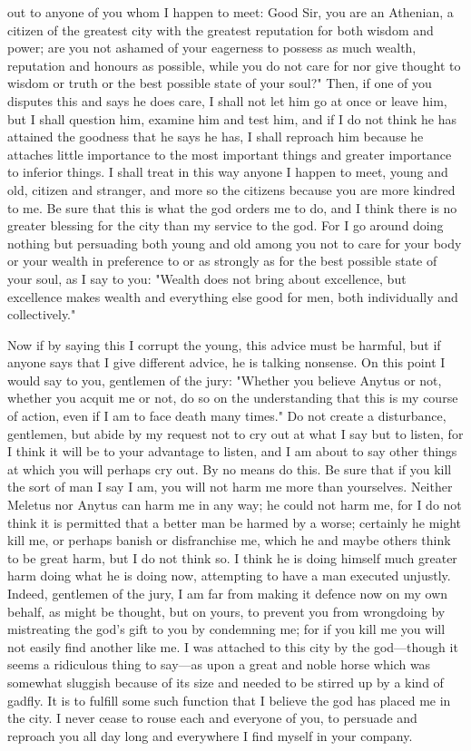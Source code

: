 out to anyone of you whom I happen to meet: Good Sir, you are an Athenian, a citizen of the
greatest city with the greatest reputation for both wisdom and power; are you not ashamed of your
eagerness to possess as much wealth, reputation and honours as possible, while you do not care
for nor give thought to wisdom or truth or the best possible state of your soul?" Then, if one of you
disputes this and says he does care, I shall not let him go at once or leave him, but I shall question
him, examine him and test him, and if I do not think he has attained the goodness that he says he
has, I shall reproach him because he attaches little importance to the most important things and
greater importance to inferior things. I shall treat in this way anyone I happen to meet, young and
old, citizen and stranger, and more so the citizens because you are more kindred to me. Be sure
that this is what the god orders me to do, and I think there is no greater blessing for the city than
my service to the god. For I go around doing nothing but persuading both young and old among
you not to care for your body or your wealth in preference to or as strongly as for the best possible
state of your soul, as I say to you: "Wealth does not bring about excellence, but excellence makes
wealth and everything else good for men, both individually and collectively."

Now if by saying this I corrupt the young, this advice must be harmful, but if anyone says that
I give different advice, he is talking nonsense. On this point I would say to you, gentlemen of the
jury: "Whether you believe Anytus or not, whether you acquit me or not, do so on the
understanding that this is my course of action, even if I am to face death many times." Do not
create a disturbance, gentlemen, but abide by my request not to cry out at what I say but to listen,
for I think it will be to your advantage to listen, and I am about to say other things at which you
will perhaps cry out. By no means do this. Be sure that if you kill the sort of man I say I am, you
will not harm me more than yourselves. Neither Meletus nor Anytus can harm me in any way; he
could not harm me, for I do not think it is permitted that a better man be harmed by a worse;
certainly he might kill me, or perhaps banish or disfranchise me, which he and maybe others think
to be great harm, but I do not think so. I think he is doing himself much greater harm doing what
he is doing now, attempting to have a man executed unjustly. Indeed, gentlemen of the jury, I am
far from making it defence now on my own behalf, as might be thought, but on yours, to prevent
you from wrongdoing by mistreating the god's gift to you by condemning me; for if you kill me
you will not easily find another like me. I was attached to this city by the god—though it seems
a ridiculous thing to say—as upon a great and noble horse which was somewhat sluggish because
of its size and needed to be stirred up by a kind of gadfly. It is to fulfill some such function that
I believe the god has placed me in the city. I never cease to rouse each and everyone of you, to
persuade and reproach you all day long and everywhere I find myself in your company.

